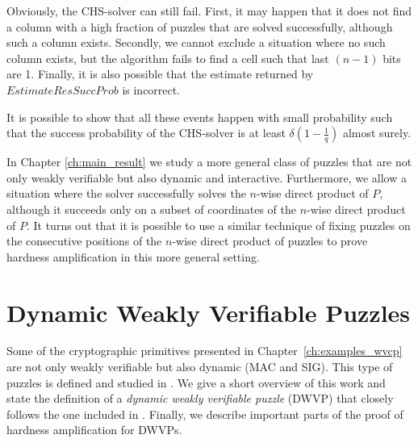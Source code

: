 Obviously, the CHS-solver can still fail. First, it may happen that it does not find a column
with a high fraction of puzzles that are solved successfully, although such a column exists.
Secondly, we cannot exclude a situation where no such column exists, but the algorithm fails to find a cell such that last $(n\!-\!1)$ bits are 1.
Finally, it is also possible that the estimate returned by $\mathit{EstimateResSuccProb}$ is incorrect.

It is possible to show that all these events happen with small probability such that
the success probability of the CHS-solver is at least $\delta(1\!-\!\frac{1}{q})$ almost surely.

In Chapter \ref{ch:main_result} we study a more general class of puzzles that are not only weakly verifiable but also dynamic and interactive.
Furthermore, we allow a situation where the solver successfully solves the $n$-wise direct product of $P$,
although it succeeds only on a subset of coordinates of the $n$-wise direct product of $P$.
It turns out that it is possible to use a similar technique of fixing puzzles on the consecutive positions of the $n$-wise direct product of
puzzles to prove hardness amplification in this more general setting.
%
\section{Dynamic Weakly Verifiable Puzzles}
\label{section:dijk}
Some of the cryptographic primitives presented in Chapter~\ref{ch:examples_wvcp}
are not only weakly verifiable but also dynamic (MAC and SIG). This type of puzzles is defined and studied in \cite{dodis2009security}.
We give a short overview of this work and state the definition of a \textit{dynamic weakly verifiable puzzle} (DWVP) that closely follows
the one included in \cite{dodis2009security}.
Finally, we describe important parts of the proof of hardness amplification for DWVPs.

